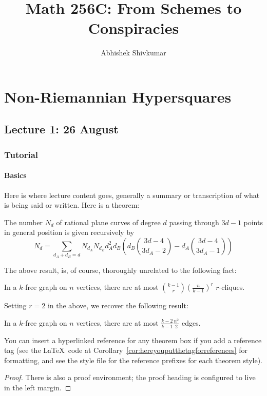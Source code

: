 \documentclass[justified, nofonts, notitlepage, openany, debug]{tufte-book}
\begin{document}
\title{Math 256C: From Schemes to Conspiracies}
\author{Abhishek Shivkumar}

\part{Non-Riemannian Hypersquares}

\chapter{Lecture 1: 26 August}
\section{Tutorial}
\subsection{Basics}

Here is where lecture content goes, generally a summary or transcription of what is being said or written. Here is a theorem:
\begin{theorem}[Kontsevich]
    The number $N_d$ of rational plane curves of degree $d$ passing through $3d-1$ points in general position is given recursively by $$N_d = \sum_{d_A + d_B = d} N_{d_A} N_{d_B} d_A^2 d_B\left(d_B\binom{3d-4}{3d_A -2} - d_A \binom{3d-4}{3d_A-1}\right)$$
\end{theorem}

The above result, is, of course, thoroughly unrelated to the following fact:
\begin{lemma}
    In a $k$-free graph on $n$ vertices, there are at most $\binom{k-1}{r} (\frac{n}{k-1})^r$ $r$-cliques.
\end{lemma}
Setting $r=2$ in the above, we recover the following result:
\begin{corollary}
    In a $k$-free graph on $n$ vertices, there are at most $\frac{k-2}{k-1} \frac{n^2}{2}$ edges. 
\end{corollary}
You can insert a hyperlinked reference for any theorem box if you add a reference tag (see the \LaTeX\ code at Corollary~\ref{cor:hereyouputthetagforreferences} for formatting, and see the style file for the reference prefixes for each theorem style).
\begin{proof}
    There is also a proof environment; the proof heading is configured to live in the left margin.
\end{proof}
\end{document}
